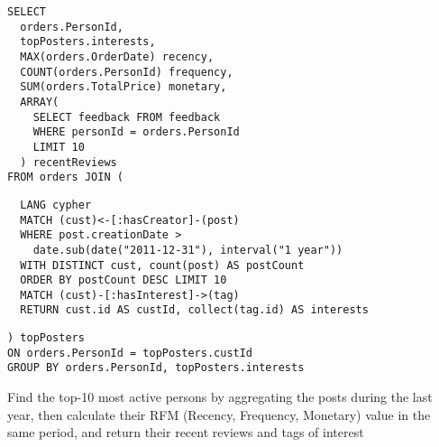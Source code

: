 \begin{listing}[!ht]
\begin{verbatim}
SELECT
  orders.PersonId,
  topPosters.interests,
  MAX(orders.OrderDate) recency,
  COUNT(orders.PersonId) frequency,
  SUM(orders.TotalPrice) monetary,
  ARRAY(
    SELECT feedback FROM feedback
    WHERE personId = orders.PersonId
    LIMIT 10
  ) recentReviews
FROM orders JOIN (
\end{verbatim}
\nestedMintedVspace
\begin{verbatim}
  LANG cypher
  MATCH (cust)<-[:hasCreator]-(post)
  WHERE post.creationDate >
    date.sub(date("2011-12-31"), interval("1 year"))
  WITH DISTINCT cust, count(post) AS postCount
  ORDER BY postCount DESC LIMIT 10
  MATCH (cust)-[:hasInterest]->(tag)
  RETURN cust.id AS custId, collect(tag.id) AS interests
\end{verbatim}
\nestedMintedVspace
\begin{verbatim}
) topPosters
ON orders.PersonId = topPosters.custId
GROUP BY orders.PersonId, topPosters.interests
\end{verbatim}
\caption{Find the top-10 most active persons by aggregating the posts during the last year, then calculate their RFM (Recency, Frequency, Monetary) value in the same period, and return their recent reviews and tags of interest}
\end{listing}